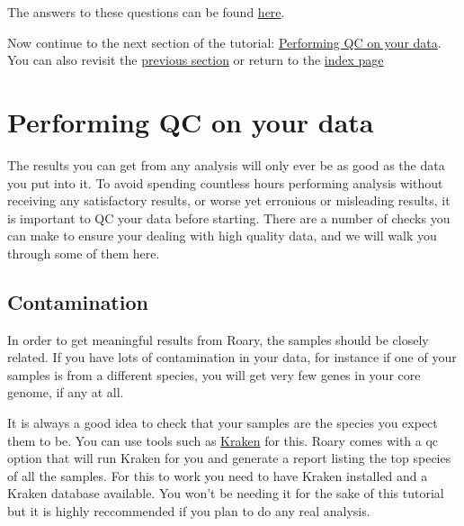 \documentclass[11pt]{article}
\begin{document}
The answers to these questions can be found \href{answers.ipynb}{here}.

Now continue to the next section of the tutorial:
\href{qc.ipynb}{Performing QC on your data}.\\
You can also revisit the \href{pan_genome.ipynb}{previous section} or
return to the \href{index.ipynb}{index page}





\newpage






    \hypertarget{performing-qc-on-your-data}{%
\section{Performing QC on your data}\label{performing-qc-on-your-data}}

The results you can get from any analysis will only ever be as good as
the data you put into it. To avoid spending countless hours performing
analysis without receiving any satisfactory results, or worse yet
erronious or misleading results, it is important to QC your data before
starting. There are a number of checks you can make to ensure your
dealing with high quality data, and we will walk you through some of
them here.

\hypertarget{contamination}{%
\subsection{Contamination}\label{contamination}}

In order to get meaningful results from Roary, the samples should be
closely related. If you have lots of contamination in your data, for
instance if one of your samples is from a different species, you will
get very few genes in your core genome, if any at all.

It is always a good idea to check that your samples are the species you
expect them to be. You can use tools such as
\href{https://www.ebi.ac.uk/research/enright/software/kraken}{Kraken}
for this. Roary comes with a qc option that will run Kraken for you and
generate a report listing the top species of all the samples. For this
to work you need to have Kraken installed and a Kraken database
available. You won't be needing it for the sake of this tutorial but it
is highly reccommended if you plan to do any real analysis.
\end{document}
